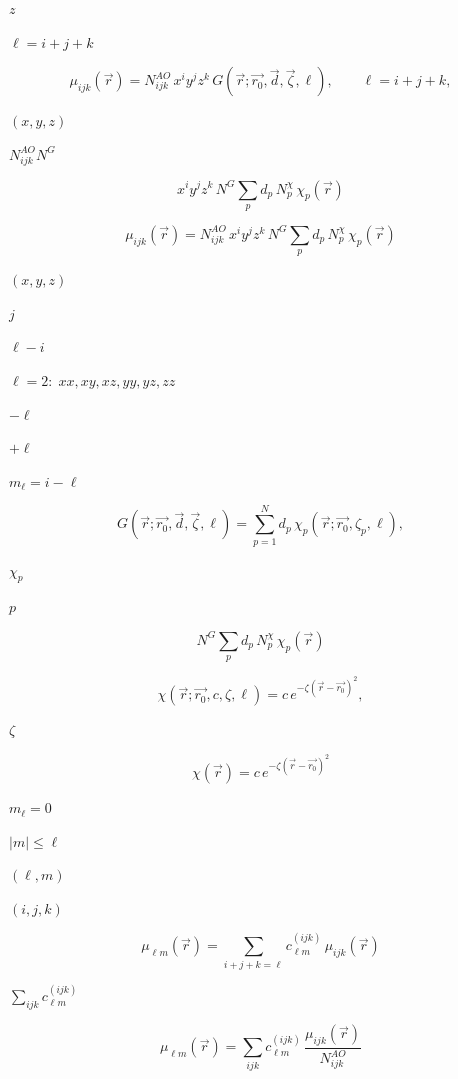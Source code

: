 \documentclass{article}
\begin{document}
$z$
\pagebreak

$\ell = i + j + k$
\pagebreak

\[
  \mu_{ijk}(\vec{r}) = N^{AO}_{ijk}\, x^i y^j z^k\,
                       G(\vec{r}; \vec{r_0}, \vec{d}, \vec{\zeta}, \ell),
  \qquad \ell = i + j + k,
\]
\pagebreak

$(x, y, z)$
\pagebreak

$N^{AO}_{ijk} N^{G}$
\pagebreak

\[
  x^i y^j z^k\, N^{G} \sum_p d_p\, N^{\chi}_p\, \chi_p(\vec{r})
\]
\pagebreak

\[
  \mu_{ijk}(\vec{r}) = N^{AO}_{ijk}\, x^i y^j z^k\, N^{G}
                       \sum_p d_p\, N^{\chi}_p\, \chi_p(\vec{r})
\]
\pagebreak

$(x,y,z)$
\pagebreak

$j$
\pagebreak

$\ell - i$
\pagebreak

$\ell = 2:\; xx, xy, xz, yy, yz, zz$
\pagebreak

$-\ell$
\pagebreak

$+\ell$
\pagebreak

$m_\ell = i - \ell$
\pagebreak

\[
  G(\vec{r}; \vec{r_0}, \vec{d}, \vec{\zeta}, \ell) =
    \sum_{p=1}^N d_p\, \chi_p(\vec{r}; \vec{r_0}, \zeta_p, \ell),
\]
\pagebreak

$\chi_p$
\pagebreak

$p$
\pagebreak

\[
  N^G \sum_p d_p\, N^{\chi}_p\, \chi_p(\vec{r})
\]
\pagebreak

\[
  \chi(\vec{r}; \vec{r_0}, c, \zeta, \ell) =
    c\, e^{-\zeta \left(\vec{r}-\vec{r_0}\right)^2},
\]
\pagebreak

$\zeta$
\pagebreak

\[
  \chi(\vec{r}) = c\, e^{-\zeta \left(\vec{r}-\vec{r_0}\right)^2}
\]
\pagebreak

$m_\ell = 0$
\pagebreak

$|m| \le \ell$
\pagebreak

$(\ell, m)$
\pagebreak

$(i, j, k)$
\pagebreak

\[
  \mu_{\ell m}(\vec{r}) = \sum_{i+j+k=\ell}
                          c^{(ijk)}_{\ell m}\, \mu_{ijk}(\vec{r})
\]
\pagebreak

$\sum_{ijk} c^{(ijk)}_{\ell m}$
\pagebreak

\[
  \mu_{\ell m}(\vec{r}) = \sum_{ijk}
    c^{(ijk)}_{\ell m}\, \frac{\mu_{ijk}(\vec{r})}{N^{AO}_{ijk}}
\]
\pagebreak
\end{document}
